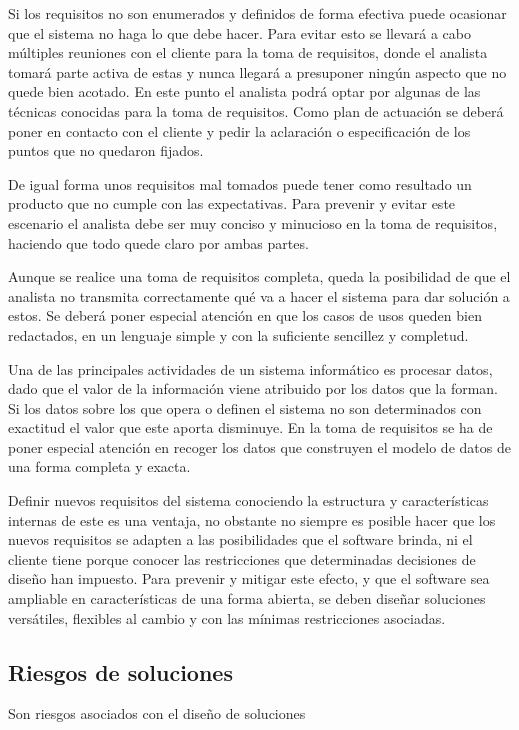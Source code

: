 Si los requisitos no son enumerados y definidos de forma efectiva puede ocasionar que el sistema no haga lo que debe hacer. Para evitar esto 
se llevará a cabo múltiples reuniones con el cliente para la toma de requisitos, donde el analista tomará parte activa de estas y nunca llegará a
presuponer ningún aspecto que no quede bien acotado. En este punto el analista podrá optar por algunas de las técnicas conocidas para la 
toma de requisitos. Como plan de actuación se deberá poner en contacto con el cliente y pedir la aclaración o especificación 
de los puntos que no quedaron fijados. 

De igual forma unos requisitos mal tomados puede tener como resultado un producto que no cumple con las expectativas. Para prevenir y evitar 
este escenario el analista debe ser muy conciso y minucioso en la toma de requisitos, haciendo que todo quede claro por ambas partes. 

Aunque se realice una toma de requisitos completa, queda la posibilidad de que el analista no transmita correctamente qué va a hacer el sistema para dar solución a 
estos. Se deberá poner especial atención en que los casos de usos queden bien redactados, en un lenguaje simple y con la suficiente sencillez y completud. 

Una de las principales actividades de un sistema informático es procesar datos, dado que el valor de la información viene atribuido por los datos que la forman. 
Si los datos sobre los que opera o definen el sistema no son determinados con exactitud el valor que este aporta disminuye. En la toma de requisitos se ha de poner especial
atención en recoger los datos que construyen el modelo de datos de una forma completa y exacta. 

Definir nuevos requisitos del sistema conociendo la estructura y características internas de este es una ventaja, no obstante no siempre es posible hacer que los
nuevos requisitos se adapten a las posibilidades que el software brinda, ni el cliente tiene porque conocer las restricciones que determinadas decisiones de diseño 
han impuesto. Para prevenir y mitigar este efecto, y que el software sea ampliable en características de una forma abierta, se deben diseñar soluciones versátiles, flexibles al cambio 
y con las mínimas restricciones asociadas.

\subsection{Riesgos de soluciones}
Son riesgos asociados con el diseño de soluciones

